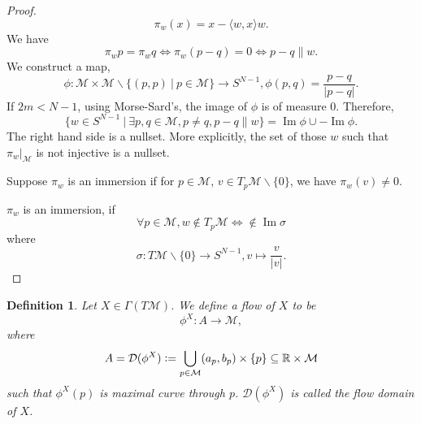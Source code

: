\documentclass[8pt]{article}
\newtheorem{definition}{Definition}[section]
\DeclareMathOperator{\Image}{Im}
\newcommand{\defeq}{\vcentcolon=}
\newcommand{\R}[0]{\mathbb{R}}
\newcommand{\M}[0]{\mathcal{M}}
\newcommand{\sep}[0]{\:|\:}
\begin{document}
\begin{proof}
  \begin{equation*}
    \pi_w(x) = x-\langle w,x\rangle w.
  \end{equation*}
  We have 
  \begin{equation*}
    \pi_wp = \pi_wq \Leftrightarrow\pi_w(p-q) = 0 \Leftrightarrow p-q\parallel w.
  \end{equation*}
  We construct a map,
  \begin{equation*}
    \phi:\M\times\M\backslash\{(p,p)\sep p\in\M\}\to S^{N-1}, \phi(p,q) = {\frac {p-q} {\vert p-q\vert}}.
  \end{equation*}
  If $2m<N-1$, using Morse-Sard's, the image of $\phi$ is of measure $0$. Therefore,
  \begin{equation*}
    \{w\in S^{N-1}\sep\exists p,q\in\M, p\not=q,p-q\parallel w\} = \Image\phi\cup -\Image\phi.
  \end{equation*}
  The right hand side is a nullset. More explicitly, the set of those $w$ such that $\pi_w|_\M$ is not injective is a nullset.
  \par Suppose $\pi_w$ is an immersion if for $p\in\M$, $v\in T_p\M\backslash\{0\}$, we have $\pi_w(v)\not=0$.
  \par $\pi_w$ is an immersion, if
  \begin{equation*}
    \forall p\in\M, w\not\in T_p\M \Leftrightarrow\not\in\Image\sigma
  \end{equation*}
  where 
  \begin{equation*}
    \sigma:T\M\backslash\{0\}\to S^{N-1}, v\mapsto {\frac v {\vert v\vert}}.
    \end{equation*} 
    
\end{proof}

\begin{definition}
  Let $X\in\Gamma(T\M)$. We define a flow of $X$ to be 
  \begin{equation*}
    \phi^X:A\to \M,
  \end{equation*}
  where 
  \begin{equation*}
    A = \mathcal{D}(\phi^X) \defeq \bigcup_{p\in\M} (a_p,b_p)\times \{p\}\subseteq \R\times \M
  \end{equation*}
  such that $\phi^X(p)$ is maximal curve through $p$. $\mathcal{D}(\phi^X)$ is called the flow domain of $X$.
\end{definition}
\end{document}

